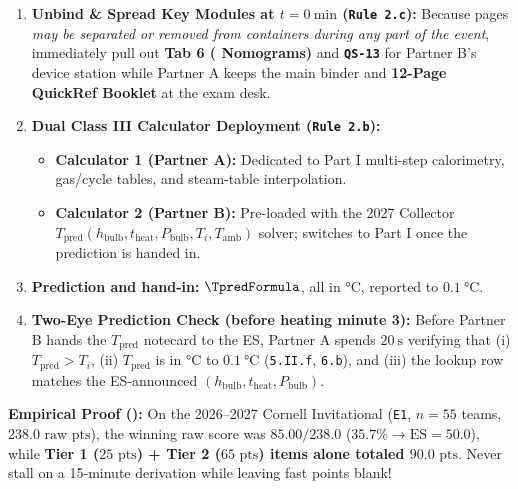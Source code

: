 \begin{twocol}[0.485]
\begin{formulacard}
\begin{enumerate}
  \item \textbf{Unbind \& Spread Key Modules at $t=\SI{0}{\minute}$ (\texttt{Rule 2.c}):} Because pages \emph{may be separated or removed from containers during any part of the event}, immediately pull out \textbf{Tab 6 ( Nomograms)} and \textbf{\texttt{QS-13}} for Partner B's device station while Partner A keeps the main binder and \textbf{12-Page QuickRef Booklet} at the exam desk.
  \item \textbf{Dual Class III Calculator Deployment (\texttt{Rule 2.b}):}
    \begin{itemize}
      \item \textbf{Calculator 1 (Partner A):} Dedicated to Part I multi-step calorimetry, gas/cycle tables, and steam-table interpolation.
      \item \textbf{Calculator 2 (Partner B):} Pre-loaded with the 2027 Collector $T_{\mathrm{pred}}(h_{\mathrm{bulb}}, t_{\mathrm{heat}}, P_{\mathrm{bulb}}, T_i, T_{\mathrm{amb}})$ solver; switches to Part I once the prediction is handed in.
    \end{itemize}
  \item \textbf{Prediction and hand-in:} $\TpredFormula$, all in $\si{\celsius}$, reported to $\SI{0.1}{\celsius}$. \HandInRule
  \item \textbf{Two-Eye Prediction Check (before heating minute 3):} Before Partner B hands the $T_{\mathrm{pred}}$ notecard to the ES, Partner A spends $\SI{20}{\second}$ verifying that (i) $T_{\mathrm{pred}} > T_i$, (ii) $T_{\mathrm{pred}}$ is in $\si{\celsius}$ to $\SI{0.1}{\celsius}$ (\texttt{5.II.f}, \texttt{6.b}), and (iii) the lookup row matches the ES-announced $(h_{\mathrm{bulb}}, t_{\mathrm{heat}}, P_{\mathrm{bulb}})$.
\end{enumerate}
\end{formulacard}
\nextcol[0.485]
\begin{formulacard}
\textbf{Empirical Proof ():} On the 2026--2027 Cornell Invitational (\texttt{E1}, $n=55$ teams, $238.0\text{ raw pts}$), the winning raw score was $85.00/238.0$ ($35.7\% \to \mathrm{ES}=50.0$), while \textbf{Tier 1 ($25\text{ pts}$) + Tier 2 ($65\text{ pts}$) items alone totaled $90.0\text{ pts}$}. Never stall on a 15-minute derivation while leaving fast points blank!

\end{formulacard}
\end{twocol}
